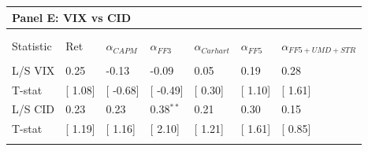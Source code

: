 \documentclass[12pt]{article}
\begin{document}
\begin{table}[!htbp]
\begin{tabularx}{\linewidth}{p{2cm}p{1.5cm}p{1.5cm}p{1.5cm}p{1.5cm}p{1.5cm}p{1.5cm}}
    \toprule
    \multicolumn{7}{l}{\textbf{Panel E: VIX vs CID}} \\
    \midrule  
\\[-1.8ex]\hline 
\hline \\[-1.8ex] 
Statistic & Ret & $\alpha_{CAPM}$ & $\alpha_{FF3}$ & $\alpha_{Carhart}$ & $\alpha_{FF5}$ & $\alpha_{FF5+UMD+STR}$ \\ 
\hline \\[-1.8ex] 
L/S VIX & 0.25 & -0.13 & -0.09 & 0.05 & 0.19 & 0.28 \\ 
T-stat & [ 1.08] & [ -0.68] & [ -0.49] & [ 0.30] & [ 1.10] & [ 1.61] \\ 
L/S CID & 0.23 & 0.23 & 0.38$^{**}$ & 0.21 & 0.30 & 0.15 \\ 
T-stat & [ 1.19] & [ 1.16] & [ 2.10] & [ 1.21] & [ 1.61] & [ 0.85] \\ 
\hline \\[-1.8ex] 
\end{tabularx} 

\end{table} 
\end{document}
